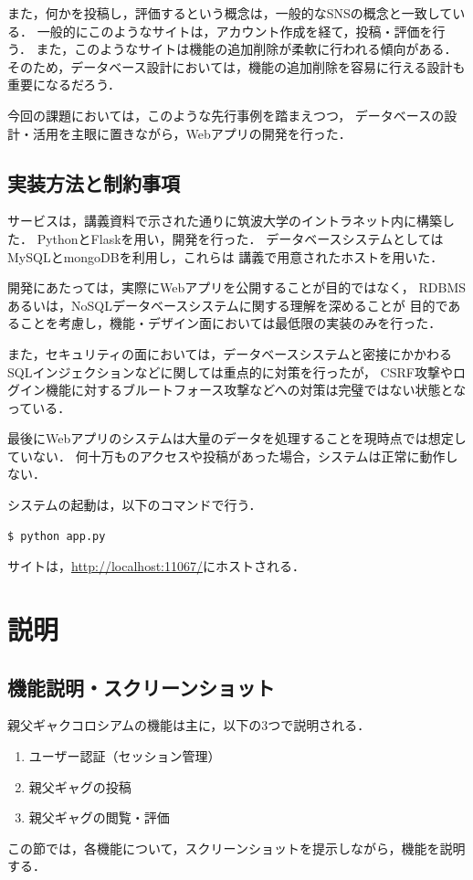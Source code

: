 \documentclass[a4paper,dvipdfmx,11pt]{jsreport}
\begin{document}
また，何かを投稿し，評価するという概念は，一般的なSNSの概念と一致している．
一般的にこのようなサイトは，アカウント作成を経て，投稿・評価を行う．
また，このようなサイトは機能の追加削除が柔軟に行われる傾向がある．
そのため，データベース設計においては，機能の追加削除を容易に行える設計も
重要になるだろう．

今回の課題においては，このような先行事例を踏まえつつ，
データベースの設計・活用を主眼に置きながら，Webアプリの開発を行った．

\section{実装方法と制約事項}
サービスは，講義資料で示された通りに筑波大学のイントラネット内に構築した．
PythonとFlaskを用い，開発を行った．
データベースシステムとしてはMySQLとmongoDBを利用し，これらは
講義で用意されたホストを用いた．

開発にあたっては，実際にWebアプリを公開することが目的ではなく，
RDBMSあるいは，NoSQLデータベースシステムに関する理解を深めることが
目的であることを考慮し，機能・デザイン面においては最低限の実装のみを行った．

また，セキュリティの面においては，データベースシステムと密接にかかわる
SQLインジェクションなどに関しては重点的に対策を行ったが，
CSRF攻撃やログイン機能に対するブルートフォース攻撃などへの対策は完璧ではない状態となっている．

最後にWebアプリのシステムは大量のデータを処理することを現時点では想定していない．
何十万ものアクセスや投稿があった場合，システムは正常に動作しない．

システムの起動は，以下のコマンドで行う．
\begin{lstlisting}
$ python app.py
\end{lstlisting}
サイトは，\url{http://localhost:11067/}にホストされる．
\chapter{説明}
\section{機能説明・スクリーンショット}
親父ギャクコロシアムの機能は主に，以下の3つで説明される．
\begin{enumerate}
  \item ユーザー認証（セッション管理）
  \item 親父ギャグの投稿
  \item 親父ギャグの閲覧・評価
\end{enumerate}
この節では，各機能について，スクリーンショットを提示しながら，機能を説明する．
\end{document}

